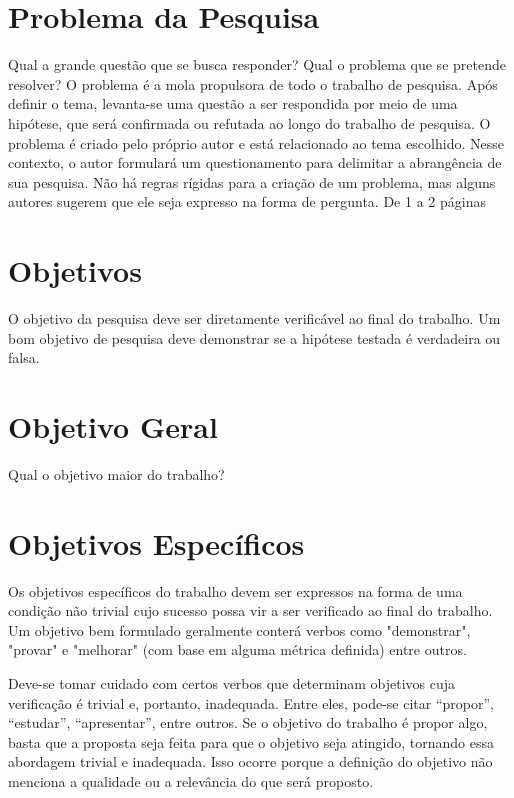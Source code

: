 \documentclass[
	12pt,				    %
	openright,			    %
	oneside,			    %
	a4paper,			    %
    sumario=tradicional,    %
	english,			    %
	brazil,				    %
	]{abntex2}
\begin{document}
\section{Problema da Pesquisa}\label{sec:ProbPesq}

Qual a grande questão que se busca responder? Qual o problema que se pretende resolver? 
O problema é a mola propulsora de todo o trabalho de pesquisa. Após definir o tema, levanta-se uma questão a ser respondida por meio de uma hipótese, que será confirmada ou refutada ao longo do trabalho de pesquisa. O problema é criado pelo próprio autor e está relacionado ao tema escolhido. Nesse contexto, o autor formulará um questionamento para delimitar a abrangência de sua pesquisa. Não há regras rígidas para a criação de um problema, mas alguns autores sugerem que ele seja expresso na forma de pergunta.
De 1 a 2 páginas

\section{Objetivos}\label{sec:objetivos}

O objetivo da pesquisa deve ser diretamente verificável ao final do trabalho. Um bom objetivo de pesquisa deve demonstrar se a hipótese testada é verdadeira ou falsa.
\section{Objetivo Geral}\label{sec:ObjGeral}

Qual o objetivo maior do trabalho?

\section{Objetivos Específicos}\label{sec:ObjEspec}

Os objetivos específicos do trabalho devem ser expressos na forma de uma condição não trivial cujo sucesso possa vir a ser verificado ao final do trabalho. Um objetivo bem formulado geralmente conterá verbos como "demonstrar", "provar" e "melhorar" (com base em alguma métrica definida) entre outros.

Deve-se tomar cuidado com certos verbos que determinam objetivos cuja verificação é trivial e, portanto, inadequada. Entre eles, pode-se citar “propor”, “estudar”, “apresentar”, entre outros. Se o objetivo do trabalho é propor algo, basta que a proposta seja feita para que o objetivo seja atingido, tornando essa abordagem trivial e inadequada. Isso ocorre porque a definição do objetivo não menciona a qualidade ou a relevância do que será proposto.
\end{document}
